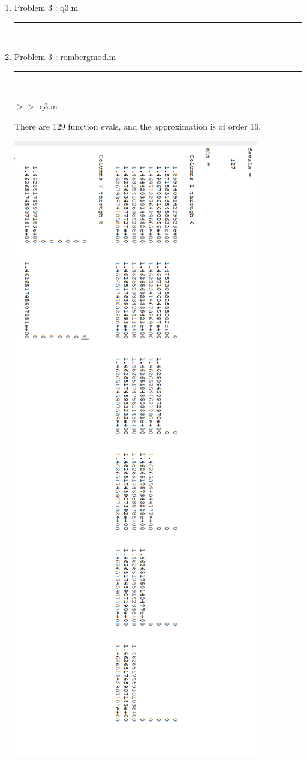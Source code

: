 \documentclass[12pt]{article}
\begin{document}
	\begin{enumerate}
	
	\item[] Problem 3 : q3.m \noindent\rule{\textwidth}{1.0pt} \\
	
	
	\item[] Problem 3 : rombergmod.m \noindent\rule{\textwidth}{1.0pt} \\
		
	
	
	\pagebreak	
	
	$>>$ q3.m
	\begin{framed}
	There are 129 function evals, and the approximation is of order 16. \\
		\begin{center}
			\includegraphics[scale=0.55]{q3out2}

\end{center}
\end{framed}
\end{enumerate}
\end{document}
